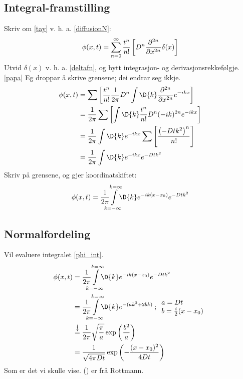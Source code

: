 \documentclass[12pt]{article}
\begin{document}
\begin{multicols*}{2}
    \subsection*{Integral-framstilling}
    Skriv om \eqref{tay} v. h. a. \eqref{diffusionN}:
    \[
        \phi(x, t) = \sum_{n = 0}^\infty
        \frac{t^n}{n!} \left[ D^n \frac{\partial^{2n} }{\partial x ^{2n}} \delta(x) \right]
    \]
    Utvid $\delta(x)$ v. h. a. \eqref{deltafn},
    og bytt integrasjon- og derivasjonsrekkefølgje. \eqref{papa}
    Eg droppar å skrive grensene; dei endrar seg ikkje.
    \begin{align*}
        \phi(x, t) &= \sum \left[
        \frac{t^n}{n!} \frac{1}{2\pi} D^n \int
    \D{k} \deldelN{}{x}{2n} e^{-ikx} \right] \\
                   &= \frac{1}{2\pi} \sum \left[ \int \D{k} \frac{t^n}{n!} D^n (-ik)^{2n} e^{-ikx} \right] \\
                   &= \frac{1}{2\pi} \int \D{k} e^{-ikx} \sum \left[ \frac{\left(-Dtk^2\right)^n}{n!} \right]\\
                   &= \frac{1}{2\pi} \int \D{k} e^{-ikx} e^{-Dtk^2}
    \end{align*}
    Skriv på grensene, og gjer koordinatskiftet:
    \begin{equation}
        \phi(x, t) = \frac{1}{2\pi}
        \smashoperator{\int\limits_{k = -\infty}^{k = \infty}}
        \D{k} e^{-ik(x - x_0)} e^{-Dtk^2}
        \label{phi_int}
    \end{equation}

    \subsection*{Normalfordeling}
    Vil evaluere integralet \eqref{phi_int}.
    \begin{align}
    \begin{split}
        \phi(x, t) &= \frac{1}{2\pi}
        \smashoperator{\int\limits_{k = -\infty}^{k = \infty}}
        \D{k} e^{-ik(x - x_0)} e^{-Dtk^2} \\
                   &= \frac{1}{2\pi}
        \smashoperator{\int\limits_{k = -\infty}^{k = \infty}}
        \D{k} e^{-(ak^2 + 2bk)} \:\text;\:
        \begin{array}{l} a = Dt \\  b = \frac{i}{2}(x - x_0) \end{array} \\
                   &\stackrel{\satan}{=} \frac{1}{2\pi} \sqrt{\frac{\pi}{a}} \exp \left(\frac{b^2}{a} \right) \\
                   &= \frac{1}{\sqrt{4\pi D t}} \exp \left( -\frac{(x - x_0)^2}{4 D t} \right)
    \end{split}\label{gauss}
    \end{align}
    Som er det vi skulle vise. (\satan) er frå Rottmann.


\end{multicols*}
\end{document}
